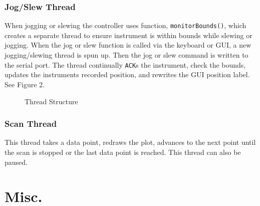 \documentclass[11pt]{article}
\begin{document}
\subsubsection{Jog/Slew Thread}
When jogging or slewing the controller uses function, \texttt{monitorBounds()}, which creates a separate thread to ensure instrument is within bounds while slewing or jogging.  
When the jog or slew function is called via the keyboard or GUI, a new jogging/slewing thread is spun up. Then the jog or slew command is written to the serial port. The thread continually \texttt{ACK}s the instrument, check the bounds, updates the instruments recorded position, and rewrites the GUI position label.  See Figure 2.

\begin{figure}[h]
    \centering
    \caption{Thread Structure}
\end{figure} 
\subsubsection{Scan Thread}
This thread takes a data point, redraws the plot, advances to the next point until the scan is stopped or the last data point is reached. This thread can also be paused. 

\section{Misc.}
\end{document}
